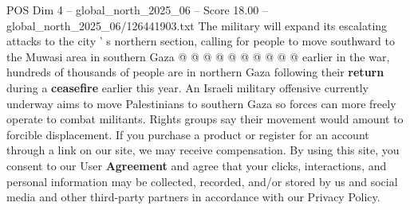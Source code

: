 \begin{textsample}{POS Dim 4 – global\_north\_2025\_06 – Score 18.00 – global\_north\_2025\_06/126441903.txt}
The military will expand its escalating attacks to the city ' s northern section, calling for people to move southward to the Muwasi area in southern Gaza @ @ @ @ @ @ @ @ @ @ earlier in the war, hundreds of thousands of people are in northern Gaza following their \textbf{return} during a \textbf{ceasefire} earlier this year.
An Israeli military offensive currently underway aims to move Palestinians to southern Gaza so forces can more freely operate to combat militants.
Rights groups say their movement would amount to forcible displacement.
If you purchase a product or register for an account through a link on our site, we may receive compensation.
By using this site, you consent to our User \textbf{Agreement} and agree that your clicks, interactions, and personal information may be collected, recorded, and/or stored by us and social media and other third-party partners in accordance with our Privacy Policy.

\end{textsample}
